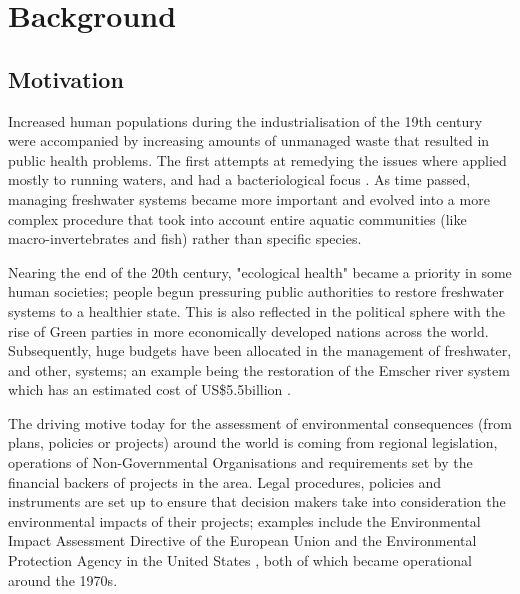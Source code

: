 
\chapter{Background}  %

\ifpdf
    \graphicspath{{Chapter1/Figs/Raster/}{Chapter1/Figs/PDF/}{Chapter1/Figs/}}
\else
    \graphicspath{{Chapter1/Figs/Vector/}{Chapter1/Figs/}}
\fi


\section{Motivation}

Increased human populations during the industrialisation of the 19th century were accompanied by increasing amounts of unmanaged waste that resulted in public health problems. The first attempts at remedying the issues where applied mostly to running waters, and had a bacteriological focus \cite{AQUATIC_INSECTS_BIOMONITORING}. As time passed, managing freshwater systems became more important and evolved into a more complex procedure that took into account entire aquatic communities (like macro-invertebrates and fish) rather than specific species.



Nearing the end of the 20th century, "ecological health" became a priority in some human societies; people begun pressuring public authorities to restore freshwater systems to a healthier state. This is also reflected in the political sphere with the rise of Green parties in more economically developed nations across the world. Subsequently, huge budgets have been allocated in the management of freshwater, and other, systems; an example being the restoration of the Emscher river system which has an estimated cost of US\$5.5billion \cite{emscher}. 

 The driving motive today for the assessment of environmental consequences (from plans, policies or projects) around the world is coming from regional legislation, operations of Non-Governmental Organisations and requirements set by the financial backers of projects in the area. Legal procedures, policies and instruments are set up to ensure that decision makers take into consideration the environmental impacts of their projects; examples include the Environmental Impact Assessment Directive of the European Union \cite{eia_eu} and the Environmental Protection Agency in the United States \cite{us_epa_our_2013}, both of which became operational around the 1970s.
 
